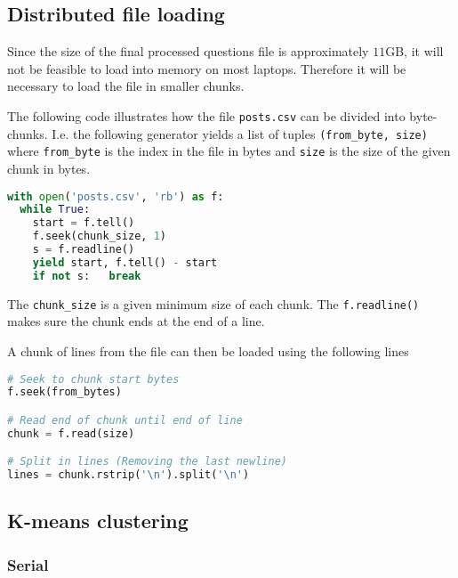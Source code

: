 \subsection{Distributed file loading}

Since the size of the final processed questions file is approximately $11$GB,
it will not be feasible to load into memory on most laptops. Therefore it will
be necessary to load the file in smaller chunks.

The following code illustrates how the file \texttt{posts.csv} can be divided
into byte-chunks. I.e. the following generator yields a list of tuples
\texttt{(from\_byte, size)} where \texttt{from\_byte} is the index in the file in
bytes and \texttt{size} is the size of the given chunk in bytes.

\begin{lstlisting}[language=python]
with open('posts.csv', 'rb') as f:
  while True:
    start = f.tell()
    f.seek(chunk_size, 1)
    s = f.readline()
    yield start, f.tell() - start
    if not s:   break
\end{lstlisting}

The \texttt{chunk\_size} is a given minimum size of each chunk. The
\texttt{f.readline()} makes sure the chunk ends at the end of a line.

A chunk of lines from the file can then be loaded using the following lines

\begin{lstlisting}[language=python]
# Seek to chunk start bytes
f.seek(from_bytes)

# Read end of chunk until end of line
chunk = f.read(size)

# Split in lines (Removing the last newline)
lines = chunk.rstrip('\n').split('\n')
\end{lstlisting}


\subsection{K-means clustering}

\subsubsection{Serial}

